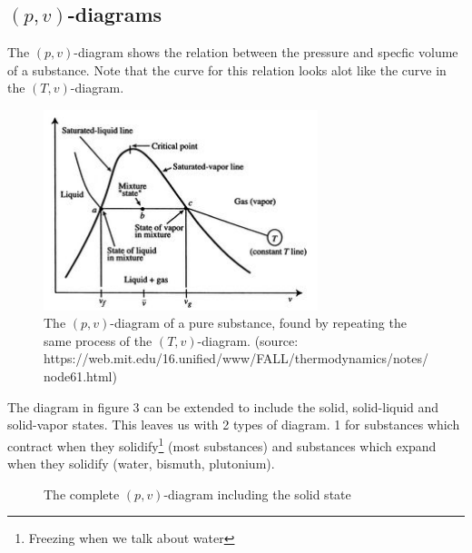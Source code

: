 \documentclass[11pt, a4paper]{article}
\begin{document}
\subsection{$(p, v)$-diagrams}
The $(p, v)$-diagram shows the relation between the pressure and specfic volume of a substance. Note that the curve for this relation looks alot like the curve in the $(T, v)$-diagram.
\begin{figure}[h]
  \centerline{\includegraphics[width=80mm]{images/p,v diagram.jpg}}
  \caption{The $(p, v)$-diagram of a pure substance, found by repeating the same process of the $(T, v)$-diagram. (source: https://web.mit.edu/16.unified/www/FALL/thermodynamics/notes/node61.html)}
\end{figure}
The diagram in figure 3 can be extended to include the solid, solid-liquid and solid-vapor states. This leaves us with 2 types of diagram. 1 for substances which contract when they solidify\footnote{Freezing when we talk about water} (most substances) and substances which expand when they solidify (water, bismuth, plutonium).
\begin{figure}[h]
  \centering
  \qquad \qquad \qquad 
  \caption{The complete $(p, v)$-diagram including the solid state}
\end{figure}
\end{document}
